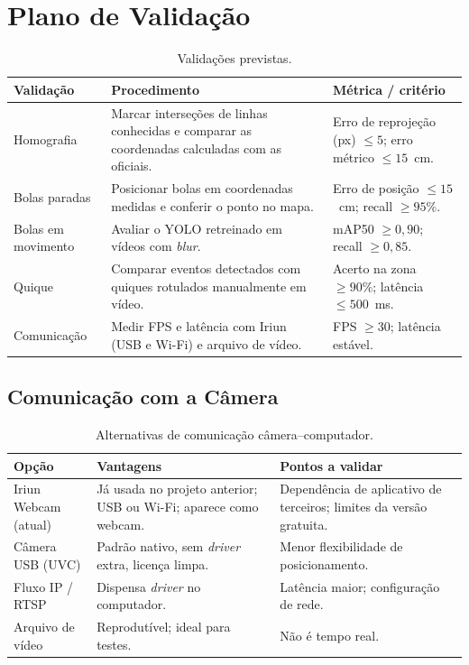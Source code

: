 \documentclass[a4paper,11pt]{article}
\begin{document}
\section{Plano de Validação}
\begin{table}[H]
\centering
\small
\renewcommand{\arraystretch}{1.25}
\caption{Validações previstas.}
\label{tab:validacao}
\begin{tabularx}{\textwidth}{l X X}
\toprule
\textbf{Validação} & \textbf{Procedimento} & \textbf{Métrica / critério} \\
\midrule
Homografia & Marcar interseções de linhas conhecidas e comparar as coordenadas calculadas com as oficiais. & Erro de reprojeção (px) $\leq 5$; erro métrico $\leq 15$~cm. \\
\rowcolor{rowgray}
Bolas paradas & Posicionar bolas em coordenadas medidas e conferir o ponto no mapa. & Erro de posição $\leq 15$~cm; recall $\geq 95\%$. \\
Bolas em movimento & Avaliar o YOLO retreinado em vídeos com \textit{blur}. & mAP50 $\geq 0{,}90$; recall $\geq 0{,}85$. \\
\rowcolor{rowgray}
Quique & Comparar eventos detectados com quiques rotulados manualmente em vídeo. & Acerto na zona $\geq 90\%$; latência $\leq 500$~ms. \\
Comunicação & Medir FPS e latência com Iriun (USB e Wi-Fi) e arquivo de vídeo. & FPS $\geq 30$; latência estável. \\
\bottomrule
\end{tabularx}
\end{table}

\subsection{Comunicação com a Câmera}
\begin{table}[H]
\centering
\small
\renewcommand{\arraystretch}{1.25}
\caption{Alternativas de comunicação câmera--computador.}
\label{tab:camera}
\begin{tabularx}{\textwidth}{l X X}
\toprule
\textbf{Opção} & \textbf{Vantagens} & \textbf{Pontos a validar} \\
\midrule
Iriun Webcam (atual) & Já usada no projeto anterior; USB ou Wi-Fi; aparece como webcam. & Dependência de aplicativo de terceiros; limites da versão gratuita. \\
\rowcolor{rowgray}
Câmera USB (UVC) & Padrão nativo, sem \textit{driver} extra, licença limpa. & Menor flexibilidade de posicionamento. \\
Fluxo IP / RTSP & Dispensa \textit{driver} no computador. & Latência maior; configuração de rede. \\
\rowcolor{rowgray}
Arquivo de vídeo & Reprodutível; ideal para testes. & Não é tempo real. \\
\bottomrule
\end{tabularx}
\end{table}
\end{document}
